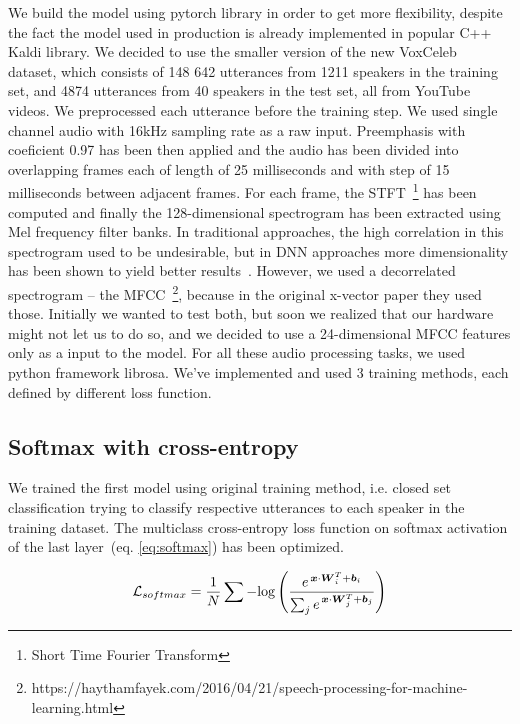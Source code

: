 We build the model using pytorch library in order to get more flexibility, despite the fact the model used in production is already implemented in popular C++ Kaldi library. We decided to use the smaller version of the new VoxCeleb~\cite{VoxCeleb} dataset, which consists of 148 642 utterances from 1211 speakers in the training set, and 4874 utterances from 40 speakers in the test set, all from YouTube videos. We preprocessed each utterance before the training step. We used single channel audio with 16kHz sampling rate as a raw input. Preemphasis with coeficient 0.97 has been then applied and the audio has been divided into overlapping frames each of length of 25 milliseconds and with step of 15 milliseconds between adjacent frames. For each frame, the STFT~\footnote{Short Time Fourier Transform} has been computed and finally the 128-dimensional spectrogram has been extracted using Mel frequency filter banks. In traditional approaches, the high correlation in this spectrogram used to be undesirable, but in DNN approaches more dimensionality has been shown to yield better results~\cite{CNN_2016}. However, we used a decorrelated spectrogram -- the MFCC~\footnote{https://haythamfayek.com/2016/04/21/speech-processing-for-machine-learning.html}, because in the original x-vector paper they used those. Initially we wanted to test both, but soon we realized that our hardware might not let us to do so, and we decided to use a 24-dimensional MFCC features only as a input to the model. For all these audio processing tasks, we used python framework librosa. We've implemented and used 3 training methods, each defined by different loss function.

\subsection*{Softmax with cross-entropy}

We trained the first model using original training method, i.e. closed set classification trying to classify respective utterances to each speaker in the training dataset. The multiclass cross-entropy loss function on softmax activation of the last layer~(eq. \ref{eq:softmax}) has been optimized.

\begin{equation} \label{eq:softmax}
\mathcal{L}_{softmax} = \frac{1}{N} \sum - \textnormal{log} \left(
\frac{e^{\,\boldsymbol{x} \cdot \boldsymbol{W}_i^T + \boldsymbol{b}_i}}
{\sum_{j} e^{\,\boldsymbol{x} \cdot \boldsymbol{W}_j^T + \boldsymbol{b}_j}}
\right)
\end{equation}

